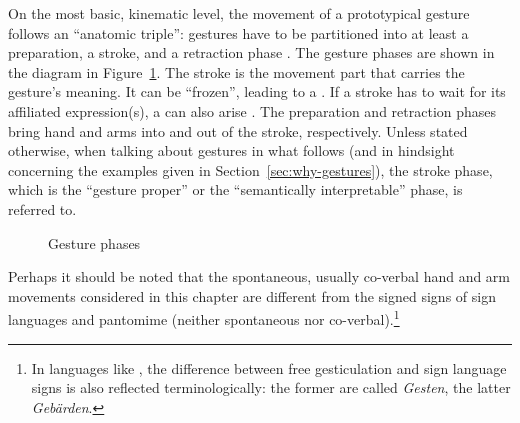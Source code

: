 \documentclass[output=paper
 	        ,biblatex
                ,babelshorthands
                ,newtxmath
                ,draftmode
                ,colorlinks, citecolor=brown
]{langscibook}
\begin{document}
On the most basic, kinematic level, the movement of a prototypical gesture follows an \enquote{anatomic triple}: gestures have to be partitioned into at least a preparation, a stroke, and a retraction phase \citep{Kendon:1972}.
%
The gesture phases are shown in the diagram in Figure~\ref{fig:gesture-phases}.
%
The stroke is the movement part that carries the gesture's meaning. 
%
It can be \enquote{frozen}, leading to a . 
%
If a stroke has to wait for its affiliated expression(s), a  can also arise \citep{Kita:vanGijn:vanDerHulst:1999}.
%
The preparation and retraction phases bring hand and arms into and out of the stroke, respectively. 
%
Unless stated otherwise, when talking about gestures in what follows (and in hindsight concerning the examples given in Section~\ref{sec:why-gestures}), the stroke phase, which is the \enquote{gesture proper} or the \enquote{semantically interpretable} phase, is referred to.

\begin{figure}[tb]
  \centering
  \caption{Gesture phases}
  \label{fig:gesture-phases}
\end{figure}


Perhaps it should be noted that the spontaneous, usually co-verbal hand and arm movements considered
in this chapter are different from the signed signs of sign languages 
and pantomime (neither spontaneous nor co-verbal).\footnote{In languages like , the difference between free gesticulation and sign language signs is also reflected terminologically: the former are called \textit{Gesten}, the latter \textit{Gebärden}.}
\end{document}
